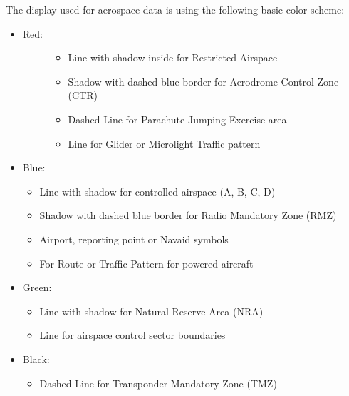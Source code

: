 \documentclass[letterpaper,10pt,english]{sphinxmanual}
\begin{document}
The display used for aerospace data is using the following basic color scheme:
\begin{itemize}
\item {} \begin{description}
\item[{Red:}] \leavevmode\begin{itemize}
\item {} 
Line with shadow inside for Restricted Airspace

\item {} 
Shadow with dashed blue border for Aerodrome Control Zone (CTR)

\item {} 
Dashed Line for Parachute Jumping Exercise area

\item {} 
Line for Glider or Microlight Traffic pattern

\end{itemize}

\end{description}

\item {} 
Blue:
\begin{itemize}
\item {} 
Line with shadow for controlled airspace (A, B, C, D)

\item {} 
Shadow with dashed blue border for Radio Mandatory Zone (RMZ)

\item {} 
Airport, reporting point or Navaid  symbols

\item {} 
For Route or Traffic Pattern for powered aircraft

\end{itemize}

\item {} 
Green:
\begin{itemize}
\item {} 
Line with shadow for Natural Reserve Area (NRA)

\item {} 
Line for airspace control sector boundaries

\end{itemize}

\item {} 
Black:
\begin{itemize}
\item {} 
Dashed Line for Transponder Mandatory Zone (TMZ)

\end{itemize}

\end{itemize}
\end{document}
